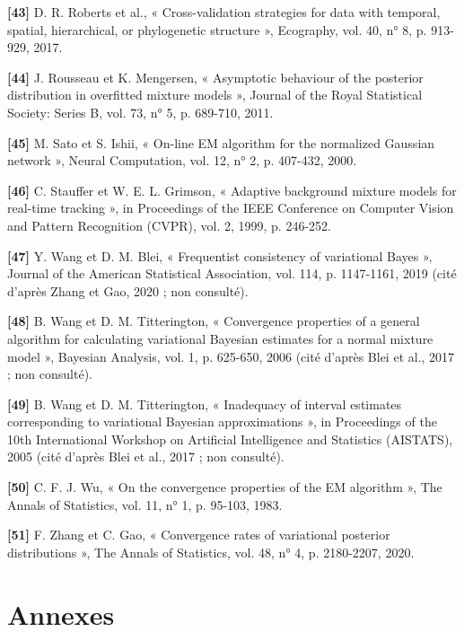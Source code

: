 \textbf{[43]  }D. R. Roberts et al., « Cross-validation strategies for data with temporal, spatial, hierarchical, or phylogenetic structure », Ecography, vol. 40, n° 8, p. 913-929, 2017.

\textbf{[44]  }J. Rousseau et K. Mengersen, « Asymptotic behaviour of the posterior distribution in overfitted mixture models », Journal of the Royal Statistical Society: Series B, vol. 73, n° 5, p. 689-710, 2011.

\textbf{[45]  }M. Sato et S. Ishii, « On-line EM algorithm for the normalized Gaussian network », Neural Computation, vol. 12, n° 2, p. 407-432, 2000.

\textbf{[46]  }C. Stauffer et W. E. L. Grimson, « Adaptive background mixture models for real-time tracking », in Proceedings of the IEEE Conference on Computer Vision and Pattern Recognition (CVPR), vol. 2, 1999, p. 246-252.

\textbf{[47]  }Y. Wang et D. M. Blei, « Frequentist consistency of variational Bayes », Journal of the American Statistical Association, vol. 114, p. 1147-1161, 2019 (cité d'après Zhang et Gao, 2020 ; non consulté).

\textbf{[48]  }B. Wang et D. M. Titterington, « Convergence properties of a general algorithm for calculating variational Bayesian estimates for a normal mixture model », Bayesian Analysis, vol. 1, p. 625-650, 2006 (cité d'après Blei et al., 2017 ; non consulté).

\textbf{[49]  }B. Wang et D. M. Titterington, « Inadequacy of interval estimates corresponding to variational Bayesian approximations », in Proceedings of the 10th International Workshop on Artificial Intelligence and Statistics (AISTATS), 2005 (cité d'après Blei et al., 2017 ; non consulté).

\textbf{[50]  }C. F. J. Wu, « On the convergence properties of the EM algorithm », The Annals of Statistics, vol. 11, n° 1, p. 95-103, 1983.

\textbf{[51]  }F. Zhang et C. Gao, « Convergence rates of variational posterior distributions », The Annals of Statistics, vol. 48, n° 4, p. 2180-2207, 2020.


\chapter*{Annexes}
